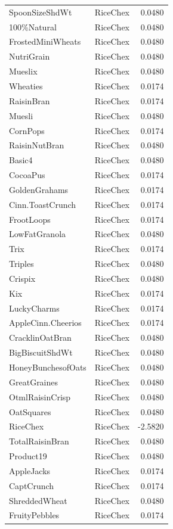 \begin{longtable}{llr}
SpoonSizeShdWt & RiceChex & 0.0480 \\
100\%Natural & RiceChex & 0.0480 \\
FrostedMiniWheats & RiceChex & 0.0480 \\
NutriGrain & RiceChex & 0.0480 \\
Mueslix & RiceChex & 0.0480 \\
Wheaties & RiceChex & 0.0174 \\
RaisinBran & RiceChex & 0.0174 \\
Muesli & RiceChex & 0.0480 \\
CornPops & RiceChex & 0.0174 \\
RaisinNutBran & RiceChex & 0.0480 \\
Basic4 & RiceChex & 0.0480 \\
CocoaPus & RiceChex & 0.0174 \\
GoldenGrahams & RiceChex & 0.0174 \\
Cinn.ToastCrunch & RiceChex & 0.0174 \\
FrootLoops & RiceChex & 0.0174 \\
LowFatGranola & RiceChex & 0.0480 \\
Trix & RiceChex & 0.0174 \\
Triples & RiceChex & 0.0480 \\
Crispix & RiceChex & 0.0480 \\
Kix & RiceChex & 0.0174 \\
LuckyCharms & RiceChex & 0.0174 \\
AppleCinn.Cheerios & RiceChex & 0.0174 \\
CracklinOatBran & RiceChex & 0.0480 \\
BigBiscuitShdWt & RiceChex & 0.0480 \\
HoneyBunchesofOats & RiceChex & 0.0480 \\
GreatGraines & RiceChex & 0.0480 \\
OtmlRaisinCrisp & RiceChex & 0.0480 \\
OatSquares & RiceChex & 0.0480 \\
RiceChex & RiceChex & -2.5820 \\
TotalRaisinBran & RiceChex & 0.0480 \\
Product19 & RiceChex & 0.0480 \\
AppleJacks & RiceChex & 0.0174 \\
CaptCrunch & RiceChex & 0.0174 \\
ShreddedWheat & RiceChex & 0.0480 \\
FruityPebbles & RiceChex & 0.0174 \\

\end{longtable}
